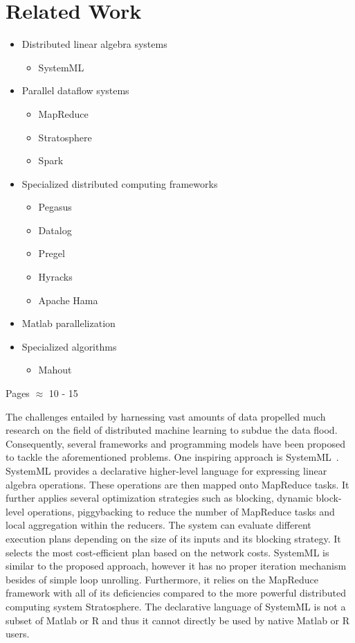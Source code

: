 \chapter{Related Work}
\label{cha:relatedwork}

\begin{itemize}
	\item Distributed linear algebra systems
	\begin{itemize}
		\item SystemML
	\end{itemize}
	\item Parallel dataflow systems
	\begin{itemize}
		\item MapReduce
		\item Stratosphere
		\item Spark
	\end{itemize}
	\item Specialized distributed computing frameworks
	\begin{itemize}
		\item Pegasus
		\item Datalog
		\item Pregel
		\item Hyracks
		\item Apache Hama
	\end{itemize}
	\item Matlab parallelization
	\item Specialized algorithms
	\begin{itemize}
		\item Mahout
	\end{itemize}
\end{itemize}

Pages $\approx$ 10 - 15

The challenges entailed by harnessing vast amounts of data propelled much research on the field of distributed machine learning to subdue the data flood.
Consequently, several frameworks and programming models have been proposed to tackle the aforementioned problems.
One inspiring approach is SystemML~\cite{ghoting:2011a}.
SystemML provides a declarative higher-level language for expressing linear algebra operations.
These operations are then mapped onto MapReduce tasks.
It further applies several optimization strategies such as blocking, dynamic block-level operations, piggybacking to reduce the number of MapReduce tasks and local aggregation within the reducers.
The system can evaluate different execution plans depending on the size of its inputs and its blocking strategy.
It selects the most cost-efficient plan based on the network costs.
SystemML is similar to the proposed approach, however it has no proper iteration mechanism besides of simple loop unrolling.
Furthermore, it relies on the MapReduce framework with all of its deficiencies compared to the more powerful distributed computing system Stratosphere.
The declarative language of SystemML is not a subset of Matlab or R and thus it cannot directly be used by native Matlab or R users.

